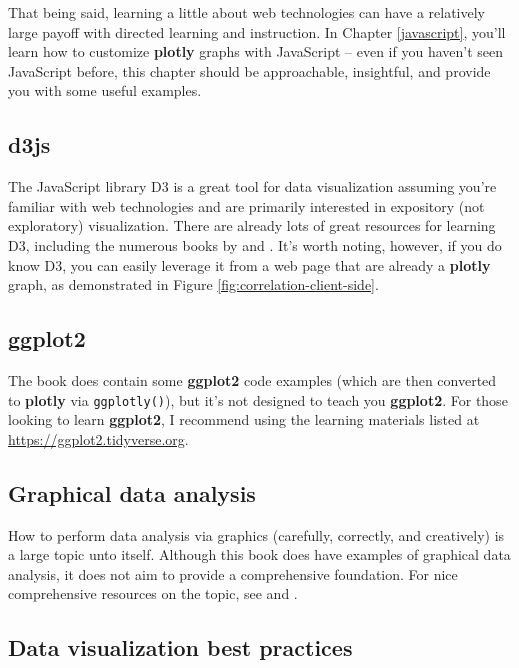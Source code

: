 \documentclass[
  12pt,
]{krantz}
\begin{document}
That being said, learning a little about web technologies can have a relatively large payoff with directed learning and instruction. In Chapter \ref{javascript}, you'll learn how to customize \textbf{plotly} graphs with JavaScript -- even if you haven't seen JavaScript before, this chapter should be approachable, insightful, and provide you with some useful examples.

\hypertarget{d3js}{%
\subsection{d3js}\label{d3js}}

The JavaScript library D3 is a great tool for data visualization assuming you're familiar with web technologies and are primarily interested in expository (not exploratory) visualization. There are already lots of great resources for learning D3, including the numerous books by \citet{murray-d3} and \citet{meeks-d3}. It's worth noting, however, if you do know D3, you can easily leverage it from a web page that are already a \textbf{plotly} graph, as demonstrated in Figure \ref{fig:correlation-client-side}.

\hypertarget{ggplot2}{%
\subsection{ggplot2}\label{ggplot2}}

The book does contain some \textbf{ggplot2} code examples (which are then converted to \textbf{plotly} via \texttt{ggplotly()}), but it's not designed to teach you \textbf{ggplot2}. For those looking to learn \textbf{ggplot2}, I recommend using the learning materials listed at \url{https://ggplot2.tidyverse.org}.

\hypertarget{graphical-data-analysis}{%
\subsection{Graphical data analysis}\label{graphical-data-analysis}}

How to perform data analysis via graphics (carefully, correctly, and creatively) is a large topic unto itself. Although this book does have examples of graphical data analysis, it does not aim to provide a comprehensive foundation. For nice comprehensive resources on the topic, see \citet{unwin-graphical-analysis} and \citet{ggobi:2007}.

\hypertarget{data-visualization-best-practices}{%
\subsection{Data visualization best practices}\label{data-visualization-best-practices}}
\end{document}
